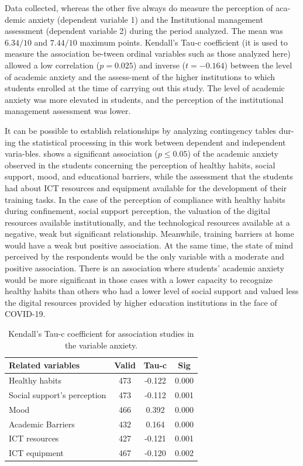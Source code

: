 \documentclass[english]{textolivre}
\begin{document}
Data collected, whereas the other five always do measure the perception of aca-demic anxiety (dependent variable 1) and the Institutional management assessment (dependent variable 2) during the period analyzed. The mean was $6.34/10$ and $7.44/10$ maximum points. Kendall's Tau-c coefficient (it is used to measure the association be-tween ordinal variables such as those analyzed here) allowed a low correlation ($p=0.025$) and inverse ($t=-0.164$) between the level of academic anxiety and the assess-ment of the higher institutions to which students enrolled at the time of carrying out this study. The level of academic anxiety was more elevated in students, and the perception of the institutional management assessment was lower.  

It can be possible to establish relationships by analyzing contingency tables dur-ing the statistical processing in this work between dependent and independent varia-bles.  shows a significant association ($p\leq 0.05$) of the academic anxiety observed in the students concerning the perception of healthy habits, social support, mood, and educational barriers, while the assessment that the students had about ICT resources and equipment available for the development of their training tasks. In the case of the perception of compliance with healthy habits during confinement, social support perception, the valuation of the digital resources available institutionally, and the technological resources available at a negative, weak but significant relationship. Meanwhile, training barriers at home would have a weak but positive association. At the same time, the state of mind perceived by the respondents would be the only variable with a moderate and positive association. There is an association where students' academic anxiety would be more significant in those cases with a lower capacity to recognize healthy habits than others who had a lower level of social support and valued less the digital resources provided by higher education institutions in the face of COVID-19.

\begin{table}[h!]
\centering
\begin{threeparttable}
\caption{Kendall's Tau-c coefficient for association studies in the variable anxiety.}
\label{Table06}
\begin{tabular}{lccc}
\toprule
Related variables & Valid & Tau-c & Sig \\
\midrule
Healthy habits & 473 & -0.122 & 0.000 \\
Social support’s perception & 473 & -0.112 & 0.001 \\
Mood & 466 & 0.392 & 0.000 \\
Academic Barriers & 432 & 0.164 & 0.000 \\
ICT resources & 427 & -0.121 & 0.001 \\
ICT equipment & 467 & -0.120 & 0.002 \\
\bottomrule
\end{tabular}
\end{threeparttable}
\end{table}
\end{document}
